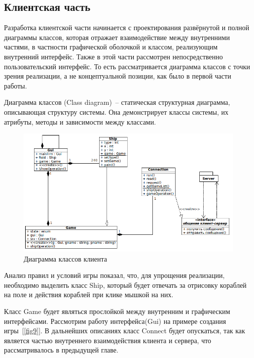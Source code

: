 ﻿\subsection{Клиентская часть}
Разработка клиентской части начинается с проектирования развёрнутой и полной диаграммы классов, которая отражает взаимодействие между внутренними частями, в частности графической оболочкой и классом, реализующим внутренний интерфейс. 
Также в этой части рассмотрен непосредственно пользовательский интерфейс. То есть рассматривается диаграмма классов с точки зрения реализации, а не концептуальной позиции, как было в первой части работы.

Диаграмма классов (Class diagram)~-- статическая структурная диаграмма, описывающая структуру системы. Она демонстрирует классы системы, их атрибуты, методы и зависимости между классами.

\begin{figure}[ht]
\centering
\includegraphics[width=18cm]{images/class_client.png}
\caption{Диаграмма классов клиента}
\label{fig8}
\end{figure}


Анализ правил и условий игры показал, что, для упрощения реализации, необходимо выделить класс Ship, который будет отвечать за отрисовку кораблей на поле и действия кораблей при клике мышкой на них.

Класс Game будет являться прослойкой между внутренним и графическим интерфейсами. Рассмотрим работу интерфейса(Gui) на примере создания игры~[\ref{fig9}]. В дальнейших описаниях класс Connect будет опускаться, так как является частью внутреннего взаимодействия клиента и сервера, что рассматривалось в предыдущей главе.

